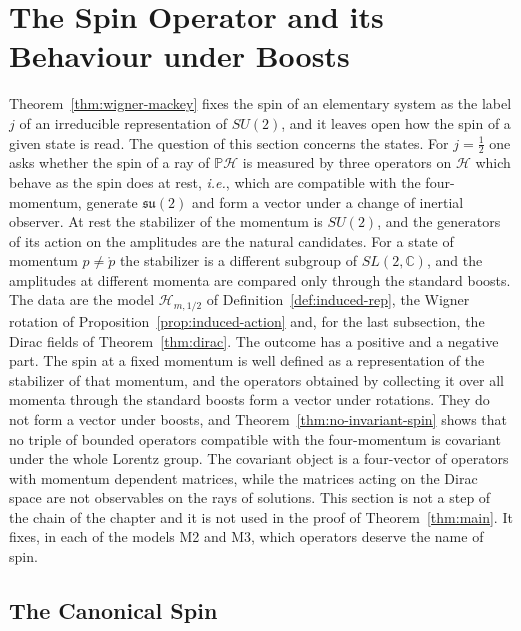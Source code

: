 \section{The Spin Operator and its Behaviour under Boosts}
\label{sec:spin-operator}

Theorem~\ref{thm:wigner-mackey} fixes the spin of an elementary system as the label $j$ of an irreducible representation of $SU(2)$, and it leaves open how the spin of a given state is read. The question of this section concerns the states. For $j=\frac12$ one asks whether the spin of a ray of $\mathbb{P}\mathcal{H}$ is measured by three operators on $\mathcal{H}$ which behave as the spin does at rest, \textit{i.e.}, which are compatible with the four-momentum, generate $\mathfrak{su}(2)$ and form a vector under a change of inertial observer. At rest the stabilizer of the momentum is $SU(2)$, and the generators of its action on the amplitudes are the natural candidates. For a state of momentum $p\neq\mathring{p}$ the stabilizer is a different subgroup of $SL(2,\mathbb{C})$, and the amplitudes at different momenta are compared only through the standard boosts. The data are the model $\mathcal{H}_{m,1/2}$ of Definition~\ref{def:induced-rep}, the Wigner rotation of Proposition~\ref{prop:induced-action} and, for the last subsection, the Dirac fields of Theorem~\ref{thm:dirac}. The outcome has a positive and a negative part. The spin at a fixed momentum is well defined as a representation of the stabilizer of that momentum, and the operators obtained by collecting it over all momenta through the standard boosts form a vector under rotations. They do not form a vector under boosts, and Theorem~\ref{thm:no-invariant-spin} shows that no triple of bounded operators compatible with the four-momentum is covariant under the whole Lorentz group. The covariant object is a four-vector of operators with momentum dependent matrices, while the matrices acting on the Dirac space are not observables on the rays of solutions. This section is not a step of the chain of the chapter and it is not used in the proof of Theorem~\ref{thm:main}. It fixes, in each of the models M2 and M3, which operators deserve the name of spin.

\subsection{The Canonical Spin}
\label{subsec:canonical-spin}


